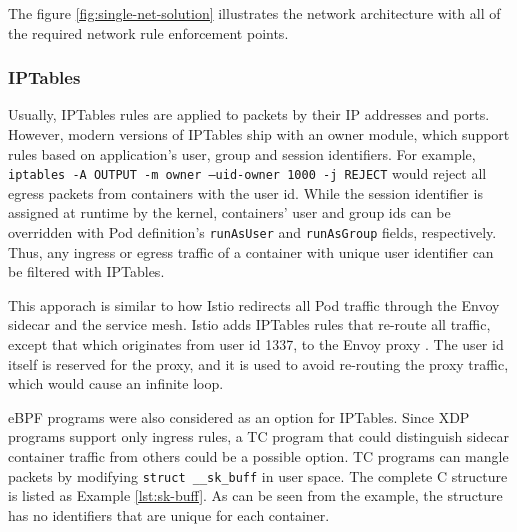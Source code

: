\documentclass[english, 12pt, a4paper, sci, utf8, a-2b, online]{aaltothesis}
\begin{document}
The figure \ref{fig:single-net-solution} illustrates the network architecture with all of the required network rule enforcement points.


\subsubsection{IPTables}

Usually, IPTables rules are applied to packets by their IP addresses and ports. However, modern versions of IPTables ship with an owner module, which support rules based on application's user, group and session identifiers. For example, \texttt{iptables -A OUTPUT -m owner --uid-owner 1000 -j REJECT} would reject all egress packets from containers with the user id. While the session identifier is assigned at runtime by the kernel, containers' user and group ids can be overridden with Pod definition's \texttt{runAsUser} and \texttt{runAsGroup} fields, respectively. Thus, any ingress or egress traffic of a container with unique user identifier can be filtered with IPTables.

This apporach is similar to how Istio redirects all Pod traffic through the Envoy sidecar and the service mesh. Istio adds IPTables rules that re-route all traffic, except that which originates from user id 1337, to the Envoy proxy \cite{istio-iptables}. The user id itself is reserved for the proxy, and it is used to avoid re-routing the proxy traffic, which would cause an infinite loop.

eBPF programs were also considered as an option for IPTables. Since XDP programs support only ingress rules, a TC program that could distinguish sidecar container traffic from others could be a possible option. TC programs can mangle packets by modifying \texttt{struct \_\_sk\_buff} in user space. The complete C structure is listed as Example \ref{lst:sk-buff}. As can be seen from the example, the structure has no identifiers that are unique for each container.
\end{document}
